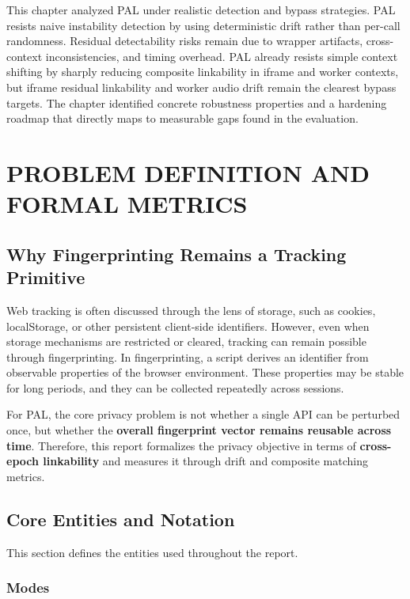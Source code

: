 \documentclass[11pt]{report}
\begin{document}
This chapter analyzed PAL under realistic detection and bypass strategies. PAL resists naive instability detection by using deterministic drift rather than per-call randomness. Residual detectability risks remain due to wrapper artifacts, cross-context inconsistencies, and timing overhead. PAL already resists simple context shifting by sharply reducing composite linkability in iframe and worker contexts, but iframe residual linkability and worker audio drift remain the clearest bypass targets. The chapter identified concrete robustness properties and a hardening roadmap that directly maps to measurable gaps found in the evaluation.









\chapter{PROBLEM DEFINITION AND FORMAL METRICS}

\section{Why Fingerprinting Remains a Tracking Primitive}

Web tracking is often discussed through the lens of storage, such as cookies, localStorage, or other persistent client-side identifiers. However, even when storage mechanisms are restricted or cleared, tracking can remain possible through fingerprinting. In fingerprinting, a script derives an identifier from observable properties of the browser environment. These properties may be stable for long periods, and they can be collected repeatedly across sessions.

For PAL, the core privacy problem is not whether a single API can be perturbed once, but whether the \textbf{overall fingerprint vector remains reusable across time}. Therefore, this report formalizes the privacy objective in terms of \textbf{cross-epoch linkability} and measures it through drift and composite matching metrics.

\section{Core Entities and Notation}

This section defines the entities used throughout the report.

\subsection{Modes}
\end{document}
